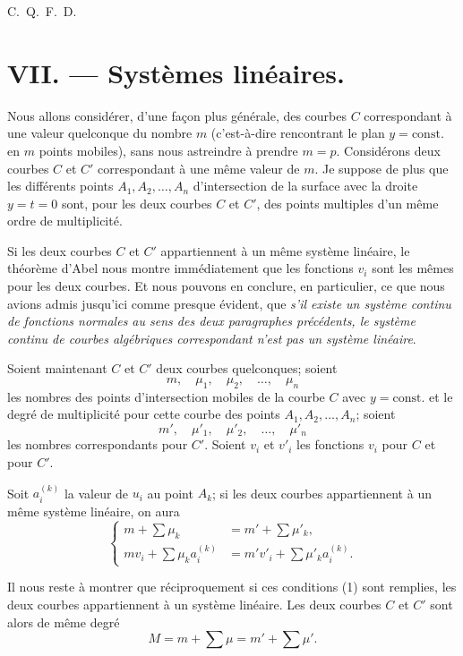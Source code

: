 \documentclass{article}
\begin{document}
C.~Q.~F.~D.

\section*{VII. --- Systèmes linéaires.}

Nous allons considérer, d'une façon plus générale, des courbes $C$ correspondant à une valeur quelconque du nombre $m$ (c'est-à-dire rencontrant le plan $y = \mathrm{const.}$ en $m$ points mobiles), sans nous astreindre à prendre $m = p$. Considérons deux courbes $C$ et $C'$ correspondant à une même valeur de $m$. Je suppose de plus que les différents points $A_{1}, A_{2}, \ldots, A_{n}$ d'intersection de la surface avec la droite $y = t = 0$ sont, pour les deux courbes $C$ et $C'$, des points multiples d'un même ordre de multiplicité.

Si les deux courbes $C$ et $C'$ appartiennent à un même système linéaire, le théorème d'Abel nous montre immédiatement que les fonctions $v_{i}$ sont les mêmes pour les deux courbes. Et nous pouvons en conclure, en particulier, ce que nous avions admis jusqu'ici comme presque évident, que \emph{s'il existe un système continu de fonctions normales au sens des deux paragraphes précédents, le système continu de courbes algébriques correspondant n'est pas un système linéaire}.

Soient maintenant $C$ et $C'$ deux courbes quelconques; soient
\[
m, \quad \mu_{1}, \quad \mu_{2}, \quad \ldots, \quad \mu_{n}
\]
les nombres des points d'intersection mobiles de la courbe $C$ avec $y = \mathrm{const.}$ et le degré de multiplicité pour cette courbe des points $A_{1}, A_{2}, \ldots, A_{n}$; soient
\[
m', \quad \mu'_{1}, \quad \mu'_{2}, \quad \ldots, \quad \mu'_{n}
\]
les nombres correspondants pour $C'$. Soient $v_{i}$ et $v'_{i}$ les fonctions $v_{i}$ pour $C$ et pour $C'$.

Soit $a_{i}^{(k)}$ la valeur de $u_{i}$ au point $A_{k}$; si les deux courbes appartiennent à un même système linéaire, on aura
\[
\left\{
\begin{aligned}
m + \sum \mu_{k} &= m' + \sum \mu'_{k}, \\
m v_{i} + \sum \mu_{k} a_{i}^{(k)} &= m' v'_{i} + \sum \mu'_{k} a_{i}^{(k)}.
\end{aligned}
\right. \tag{1}
\]

Il nous reste à montrer que réciproquement si ces conditions (1)
sont remplies, les deux courbes appartiennent à un système linéaire.
Les deux courbes $C$ et $C'$ sont alors de même degré
\[
M = m + \sum \mu = m' + \sum \mu'.
\]
\end{document}
